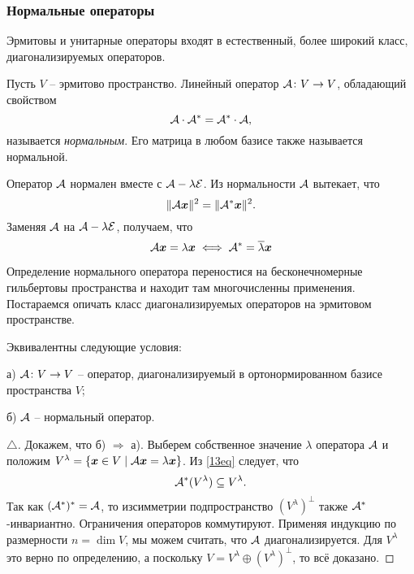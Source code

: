 \subsubsection{Нормальные операторы}
Эрмитовы и унитарные операторы входят в естественный, более широкий класс, диагонализируемых операторов.

\begin{to_def} 
    Пусть $V$ -- эрмитово пространство. Линейный оператор $\mathcal A \colon V \to V$, обладающий свойством 
    $$
        \mathcal A \cdot \mathcal A^* = \mathcal A^* \cdot \mathcal A,
    $$
    называется \textit{нормальным}. Его матрица в любом базисе также называется нормальной.
\end{to_def}

Оператор $\mathcal A$ нормален вместе с $\mathcal A - \lambda \mathcal E$. Из нормальности $\mathcal A$ вытекает, что 
$$
    \|\mathcal A \mbox{\boldmath $x$} \|^2 = \|\mathcal A^* \mbox{\boldmath $x$}\|^2.
$$
Заменяя $\mathcal A$ на $\mathcal A - \lambda \mathcal E$, получаем, что
\begin{equation}
\label{13eq}
    \mathcal A \mbox{\boldmath $x$} = \lambda \mbox{\boldmath $x$} \; \Longleftrightarrow \; \mathcal A^* = \overline{\lambda} \mbox{\boldmath $x$}
\end{equation}



Определение нормального оператора переностися на бесконечномерные гильбертовы пространства и находит там многочисленны применения. Постараемся опичать класс диагонализируемых операторов на эрмитовом пространстве.

\begin{to_thr} 
    Эквивалентны следующие условия: 

    а) $\mathcal A \colon V \to V$ -- оператор, диагонализируемый в ортонормированном базисе пространства $V$;

    б) $\mathcal A$ -- нормальный оператор.
\end{to_thr}

\begin{proof}[$\triangle$]
    Докажем, что б) $\Longrightarrow$ а). Выберем собственное значение $\lambda$ оператора $\mathcal A$ и положим $V^{\lambda} = \{ \mbox{\boldmath $x$} \in V \mid \mathcal A \mbox{\boldmath $x$} = \lambda \mbox{\boldmath $x$}\}$. Из \eqref{13eq} следует, что 
    $$
        \mathcal A^* (V^{\lambda}) \subseteq V^{\lambda}.
    $$
    Так как $(\mathcal A^*)^* = \mathcal A$, то изсимметрии подпространство $(V^\lambda)^{\bot}$ также $\mathcal A^*$-инвариантно. Ограничения операторов коммутируют. Применяя индукцию по размерности $n = \dim V$, мы можем считать, что $\mathcal A$  диагонализируется. Для $V^{\lambda}$ это верно по определению, а поскольку $V = V^\lambda \oplus \left(V^\lambda\right)^{\bot}$, то всё доказано.  
\end{proof}


